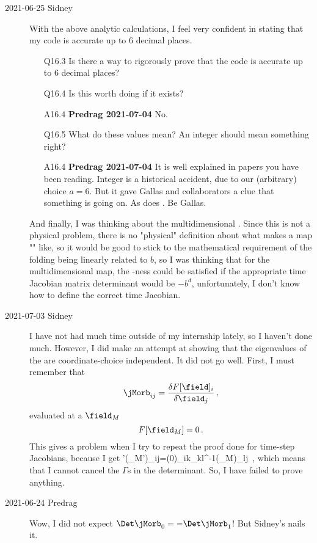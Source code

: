 \begin{description}
\item[2021-06-25 Sidney]
With the above analytic
calculations, I feel very confident in stating that my code is accurate up to
6 decimal places.
\begin{itemize}
	\item[Q16.3]
Is there a way to rigorously prove that the code is accurate up to 6 decimal
places?
	\item[Q16.4] Is this worth doing if it exists?
	\item[A16.4] {\bf Predrag 2021-07-04} No.
	\item[Q16.5]
What do these values mean? An integer {\HillDet} should mean something right?
	\item[A16.4] {\bf Predrag 2021-07-04}
It is well explained in papers you have been reading. Integer {\HillDet}
is a historical accident, due to our (arbitrary) choice $a=6$. But it gave
Gallas and collaborators a clue that something is going on. As does
. Be Gallas.
\end{itemize}
And finally, I was thinking about the multidimensional {\HenonMap}. Since
this is not a physical problem, there is no "physical" definition about what
makes a map "{\HenonMap}" like, so it would be good to stick to the
mathematical requirement of the folding being linearly related to $b$, so I
was thinking that for the multidimensional map, the \Henon-ness could be
satisfied if the appropriate time Jacobian matrix determinant would be
$-b^d$, unfortunately, I don't know how to define the correct time Jacobian.

\item[2021-07-03 Sidney]
I have not had much time outside of my internship lately, so I haven't done
much. However, I did make an attempt at showing that the eigenvalues of the
{\jacobianOrb} are coordinate-choice independent. It did not go well. First, I must
remember that
\[
\jMorb_{ij}=\frac{\delta F[{\bf \field}]_i}{\delta \field_j}
\,,
\]
 evaluated at a {\lattstate} ${\bf \field}_M$
\[
F[{\bf \field}_M]=0
\,.
\]
This gives a problem when I try to repeat the proof done for time-step
Jacobians, because I get
\beq
\jMorb'({\bf \field}_M')_{ij}=\Gamma(0)_{ik}\jMorb_{kl}\Gamma^{-1}({\bf \field}_M)_{lj}
\,,
which means that I cannot cancel the $\Gamma$s in the determinant. So, I have
failed to prove anything.

\item[2021-06-24 Predrag]
Wow, I did not expect
$\Det\jMorb_{0}=-\Det\jMorb_{1}$! But Sidney's  nails it.


\end{description}
